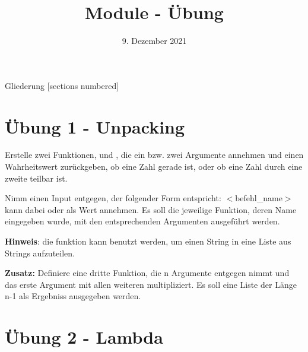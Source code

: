 



\title{Module - Übung}
\date{9. Dezember 2021}


\maketitle

\begin{frame}{Gliederung}
	[sections numbered]
	\tableofcontents
\end{frame}

\section{Übung 1 - Unpacking}
\begin{frame}
	Erstelle zwei Funktionen,  und , die ein bzw. zwei Argumente annehmen und einen Wahrheitswert zurückgeben, ob eine Zahl gerade ist, oder ob eine Zahl durch eine zweite teilbar ist.
	
	Nimm einen Input entgegen, der folgender Form entspricht:
	$<$befehl\_name$>$ kann dabei  oder  als Wert annehmen.
	Es soll die jeweilige Funktion, deren Name eingegeben wurde, mit den entsprechenden Argumenten ausgeführt werden.
	
	\textbf{Hinweis}: die  funktion kann benutzt werden, um einen String in eine Liste aus Strings aufzuteilen.
\end{frame}
\begin{frame}
	\textbf{Zusatz:}
	Definiere eine dritte Funktion,  die n Argumente entgegen nimmt und das erste Argument mit allen weiteren multipliziert. Es soll eine Liste der Länge n-1 als Ergebniss ausgegeben werden.
\end{frame}

\section{Übung 2 - Lambda}
\begin{frame}
	
\end{frame}



